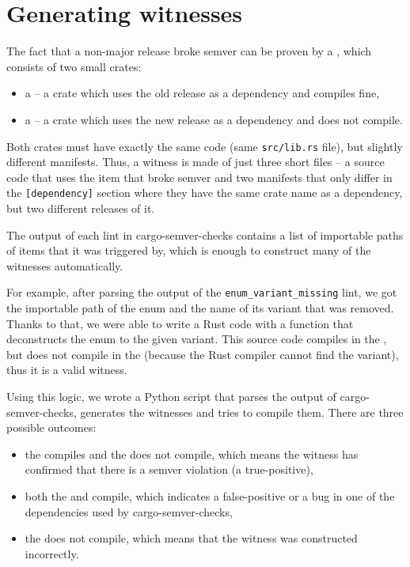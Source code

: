 \documentclass[licencjacka,en]{pracamgr}
\begin{document}
\section{Generating witnesses}\label{r:section_generating_witnesses}

The fact that a non-major release broke semver can be proven by a ,
which consists of two small crates:
\begin{itemize}
	\item a  -- a crate which uses the old release as a dependency
		and compiles fine,
	\item a  -- a crate which uses the new release as a dependency
		and does not compile.
\end{itemize}
Both crates must have exactly the same code (same \texttt{src/lib.rs} file),
but slightly different manifests.
Thus, a witness is made of just three short files -- a source code that uses the item that
broke semver and two manifests that only differ in the \texttt{[dependency]} section
where they have the same crate name as a dependency, but two different releases of it.

The output of each lint in cargo-semver-checks contains a list of importable paths
of items that it was triggered by, which is enough to construct many of the witnesses automatically.

For example, after parsing the output of the \texttt{enum\_variant\_missing} lint,
we got the importable path of the enum and the name of its variant that was removed.
Thanks to that, we were able to write a Rust code with a function that deconstructs the enum
to the given variant. This source code compiles in the , but does not compile
in the  (because the Rust compiler cannot find the variant), thus it is a valid witness.

Using this logic, we wrote a Python script that parses the output of cargo-semver-checks,
generates the witnesses and tries to compile them.
There are three possible outcomes:
\begin{itemize}
	\item the  compiles and the  does not compile, which means the witness has confirmed that there is a semver violation (a true-positive),
	\item both the  and  compile, which indicates a false-positive or a bug in one of the dependencies used by cargo-semver-checks,
	\item the  does not compile, which means that the witness was constructed incorrectly.
\end{itemize}
\end{document}
